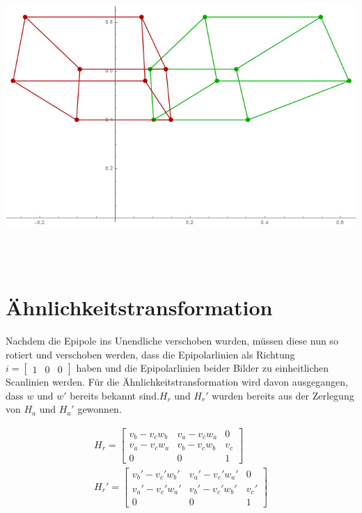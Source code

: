 \begin{minipage}{\linewidth}
	\centering
	\includegraphics[width=1.\linewidth]{images/Rectification_Hp_same_Solutions.png}
\end{minipage}\\ \\

\section{Ähnlichkeitstransformation}

Nachdem die Epipole ins Unendliche verschoben wurden, müssen diese nun so rotiert und verschoben werden, dass die Epipolarlinien als Richtung $i = \begin{bmatrix}1&0&0\end{bmatrix}$ haben und die Epipolarlinien beider Bilder zu einheitlichen Scanlinien werden. Für die Ähnlichkeitstransformation wird davon ausgegangen, dass $w$ und $w'$ bereits bekannt sind.$H_r$ und $H_r'$ wurden bereits aus der Zerlegung von $H_a$ und $H_a'$ gewonnen.

\begin{gather}
		H_r = 
	\begin{bmatrix}
	v_b-v_cw_b&	v_a-v_cw_a&0\\
	v_a-v_cw_a&v_b-v_cw_b&v_c\\
	0&0&1
	\end{bmatrix}\\
		H_r' = 
	\begin{bmatrix}
	v_b'-v_c'w_b'&	v_a'-v_c'w_a'&0\\
	v_a'-v_c'w_a'&v_b'-v_c'w_b'&v_c'\\
	0&0&1
	\end{bmatrix}\\
\end{gather}

